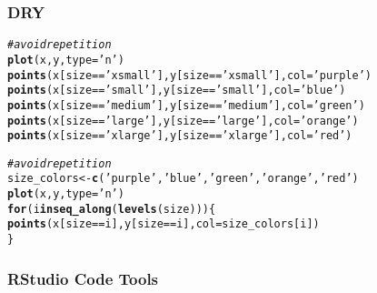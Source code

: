 \documentclass[12pt]{beamer}\usepackage[]{graphicx}\usepackage[]{color}
\makeatletter
\newcommand{\hlstr}[1]{\textcolor[rgb]{0.192,0.494,0.8}{#1}}%
\newcommand{\hlcom}[1]{\textcolor[rgb]{0.678,0.584,0.686}{\textit{#1}}}%
\newcommand{\hlopt}[1]{\textcolor[rgb]{0,0,0}{#1}}%
\newcommand{\hlstd}[1]{\textcolor[rgb]{0.345,0.345,0.345}{#1}}%
\newcommand{\hlkwa}[1]{\textcolor[rgb]{0.161,0.373,0.58}{\textbf{#1}}}%
\newcommand{\hlkwb}[1]{\textcolor[rgb]{0.69,0.353,0.396}{#1}}%
\newcommand{\hlkwc}[1]{\textcolor[rgb]{0.333,0.667,0.333}{#1}}%
\newcommand{\hlkwd}[1]{\textcolor[rgb]{0.737,0.353,0.396}{\textbf{#1}}}%
\newenvironment{kframe}{%
 \def\at@end@of@kframe{}%
 \ifinner\ifhmode%
  \def\at@end@of@kframe{\end{minipage}}%
  \begin{minipage}{\columnwidth}%
 \fi\fi%
 \def\FrameCommand##1{\hskip\@totalleftmargin \hskip-\fboxsep
 \colorbox{shadecolor}{##1}\hskip-\fboxsep
     \hskip-\linewidth \hskip-\@totalleftmargin \hskip\columnwidth}%
 \MakeFramed {\advance\hsize-\width
   \@totalleftmargin\z@ \linewidth\hsize
   \@setminipage}}%
 {\par\unskip\endMakeFramed%
 \at@end@of@kframe}
\newenvironment{knitrout}{}{} %
\makeatother
\begin{document}
\begin{frame}[fragile]
\frametitle{DRY}

\begin{knitrout}\scriptsize
{}\color{fgcolor}\begin{kframe}
\begin{alltt}
\hlcom{# avoid repetition}
\hlkwd{plot}\hlstd{(x, y,} \hlkwc{type} \hlstd{=} \hlstr{'n'}\hlstd{)}
\hlkwd{points}\hlstd{(x[size} \hlopt{==} \hlstr{'xsmall'}\hlstd{], y[size} \hlopt{==} \hlstr{'xsmall'}\hlstd{],} \hlkwc{col} \hlstd{=} \hlstr{'purple'}\hlstd{)}
\hlkwd{points}\hlstd{(x[size} \hlopt{==} \hlstr{'small'}\hlstd{], y[size} \hlopt{==} \hlstr{'small'}\hlstd{],} \hlkwc{col} \hlstd{=} \hlstr{'blue'}\hlstd{)}
\hlkwd{points}\hlstd{(x[size} \hlopt{==} \hlstr{'medium'}\hlstd{], y[size} \hlopt{==} \hlstr{'medium'}\hlstd{],} \hlkwc{col} \hlstd{=} \hlstr{'green'}\hlstd{)}
\hlkwd{points}\hlstd{(x[size} \hlopt{==} \hlstr{'large'}\hlstd{], y[size} \hlopt{==} \hlstr{'large'}\hlstd{],} \hlkwc{col} \hlstd{=} \hlstr{'orange'}\hlstd{)}
\hlkwd{points}\hlstd{(x[size} \hlopt{==} \hlstr{'xlarge'}\hlstd{], y[size} \hlopt{==} \hlstr{'xlarge'}\hlstd{],} \hlkwc{col} \hlstd{=} \hlstr{'red'}\hlstd{)}
\end{alltt}
\end{kframe}
\end{knitrout}

\pause
\begin{knitrout}\scriptsize
{}\color{fgcolor}\begin{kframe}
\begin{alltt}
\hlcom{# avoid repetition}
\hlstd{size_colors} \hlkwb{<-} \hlkwd{c}\hlstd{(}\hlstr{'purple'}\hlstd{,} \hlstr{'blue'}\hlstd{,} \hlstr{'green'}\hlstd{,} \hlstr{'orange'}\hlstd{,} \hlstr{'red'}\hlstd{)}
\hlkwd{plot}\hlstd{(x, y,} \hlkwc{type} \hlstd{=} \hlstr{'n'}\hlstd{)}
\hlkwa{for} \hlstd{(i} \hlkwa{in} \hlkwd{seq_along}\hlstd{(}\hlkwd{levels}\hlstd{(size))) \{}
  \hlkwd{points}\hlstd{(x[size} \hlopt{==} \hlstd{i], y[size} \hlopt{==} \hlstd{i],} \hlkwc{col} \hlstd{= size_colors[i])}
\hlstd{\}}
\end{alltt}
\end{kframe}
\end{knitrout}

\end{frame}


\begin{frame}[fragile]
\frametitle{RStudio Code Tools}
\begin{center}
\end{center}
\end{frame}
\end{document}
